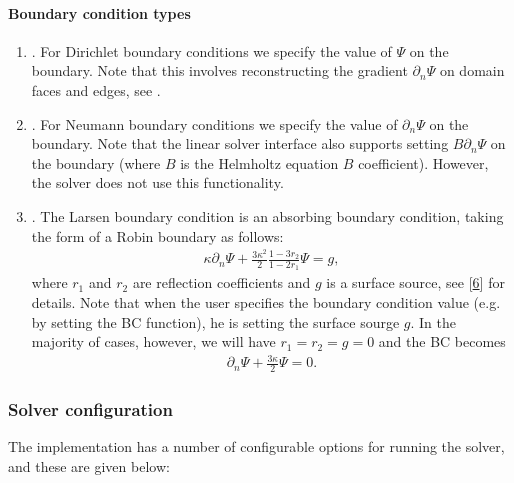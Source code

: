 \documentclass[letterpaper,10pt,english]{sphinxmanual}
\begin{document}
\paragraph{Boundary condition types}
\label{\detokenize{Solvers/RTE:boundary-condition-types}}\begin{enumerate}
%
\item {} 
\sphinxAtStartPar
{}.
For Dirichlet boundary conditions we specify the value of \(\Psi\) on the boundary.
Note that this involves reconstructing the gradient \(\partial_n\Psi\) on domain faces and edges, see .

\item {} 
\sphinxAtStartPar
{}.
For Neumann boundary conditions we specify the value of \(\partial_n\Psi\) on the boundary.
Note that the linear solver interface also supports setting \(B\partial_n\Psi\) on the boundary (where \(B\) is the Helmholtz equation \(B\) coefficient).
However, the  solver does not use this functionality.

\item {} 
\sphinxAtStartPar
{}.
The Larsen boundary condition is an absorbing boundary condition, taking the form of a Robin boundary as follows:
\begin{equation*}
\begin{split}\kappa\partial_n\Psi + \frac{3\kappa^2}{2}\frac{1-3r_2}{1-2r_1}\Psi = g,\end{split}
\end{equation*}
\sphinxAtStartPar
where \(r_1\) and \(r_2\) are reflection coefficients and \(g\) is a surface source, see {[}\hyperlink{cite.ZZReferences:id51}{6}{]} for details.
Note that when the user specifies the boundary condition value (e.g. by setting the BC function), he is setting the surface sourge \(g\).
In the majority of cases, however, we will have \(r_1 = r_2 = g = 0\) and the BC becomes
\begin{equation*}
\begin{split}\partial_n\Psi + \frac{3\kappa}{2}\Psi = 0.\end{split}
\end{equation*}
\end{enumerate}


\subsubsection{Solver configuration}
\label{\detokenize{Solvers/RTE:solver-configuration}}
\sphinxAtStartPar
The  implementation has a number of configurable options for running the solver, and these are given below:
\end{document}
